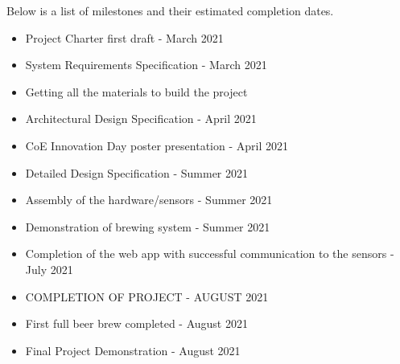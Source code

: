 Below is a list of milestones and their estimated completion dates.
\begin{itemize}
  \item Project Charter first draft - March 2021
  \item System Requirements Specification - March 2021
  \item Getting all the materials to build the project
  \item Architectural Design Specification - April 2021
  \item CoE Innovation Day poster presentation - April 2021
  \item Detailed Design Specification - Summer 2021
  \item Assembly of the hardware/sensors - Summer 2021
  \item Demonstration of brewing system - Summer 2021
  \item Completion of the web app with successful communication to the sensors - July 2021
  \item COMPLETION OF PROJECT - AUGUST 2021
  \item First full beer brew completed - August 2021
  \item Final Project Demonstration - August 2021
\end{itemize}